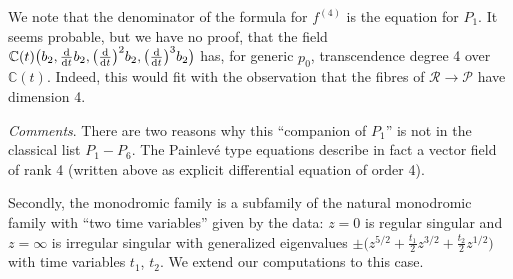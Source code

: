 \documentclass[10pt,a4paper]{amsart}
\numberwithin{equation}{section}
\begin{document}
We note that the denominator of the formula for $f^{(4)}$ is the equation for $P_1$. It seems probable, but we have no proof, that
the field $\mathbb{C}(t)\bigl(b_2,\frac{{\rm d}}{{\rm d}t}b_2,\bigl(\frac{{\rm d}}{{\rm d}t}\bigr)^2b_2,\bigl(\frac{{\rm d}}{{\rm d}t}\bigr)^3b_2\bigr)$ has, for generic $p_0$, transcendence degree 4 over
$\mathbb{C}(t)$. Indeed, this would fit with the observation that the fibres of
$\mathcal{R}\rightarrow \mathcal{P}$ have dimension 4.

 {\it Comments}. There are two reasons why this ``companion of $P_1$'' is not in the classical list
$P_1-P_6$. The Painlev\'e type equations describe in fact a vector field of rank 4
(written above as explicit differential equation of order 4).

Secondly, the monodromic family is a subfamily of the natural monodromic family with ``two time variables''
given by the data: $z=0$ is regular singular and $z=\infty$ is irregular singular with generalized eigenvalues
$\pm \bigl(z^{5/2}+\frac{t_1}{2}z^{3/2}+\frac{t_2}{2}z^{1/2}\bigr)$ with time variables $t_1$, $t_2$. We extend our computations to this case.
\end{document}

